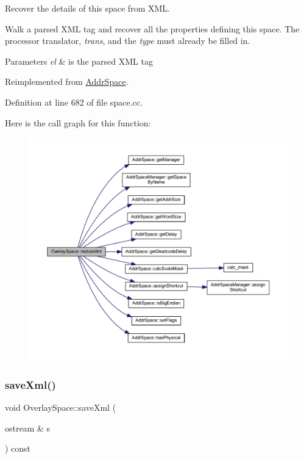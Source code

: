 Recover the details of this space from X\+ML. 

Walk a parsed X\+ML tag and recover all the properties defining this space. The processor translator, {\itshape trans}, and the {\itshape type} must already be filled in. 
\begin{DoxyParams}{Parameters}
{\em el} & is the parsed X\+ML tag \\
\hline
\end{DoxyParams}


Reimplemented from \mbox{\hyperlink{class_addr_space_aa2fe50d288eef7ea713cce99774c4eca}{Addr\+Space}}.



Definition at line 682 of file space.\+cc.

Here is the call graph for this function\+:
\nopagebreak
\begin{figure}[H]
\begin{center}
\leavevmode
\includegraphics[width=350pt]{class_overlay_space_ac954d7e1ddb57d0f811b4200bd0deee2_cgraph}
\end{center}
\end{figure}
\mbox{\label{class_overlay_space_a60c25f7c85366b0d7dd0fdf2755180b2}} 
\subsubsection{\texorpdfstring{saveXml()}{saveXml()}}
{\footnotesize\ttfamily void Overlay\+Space\+::save\+Xml (\begin{DoxyParamCaption}\item[{ostream \&}]{s }\end{DoxyParamCaption}) const\hspace{0.3cm}{\ttfamily [virtual]}}



